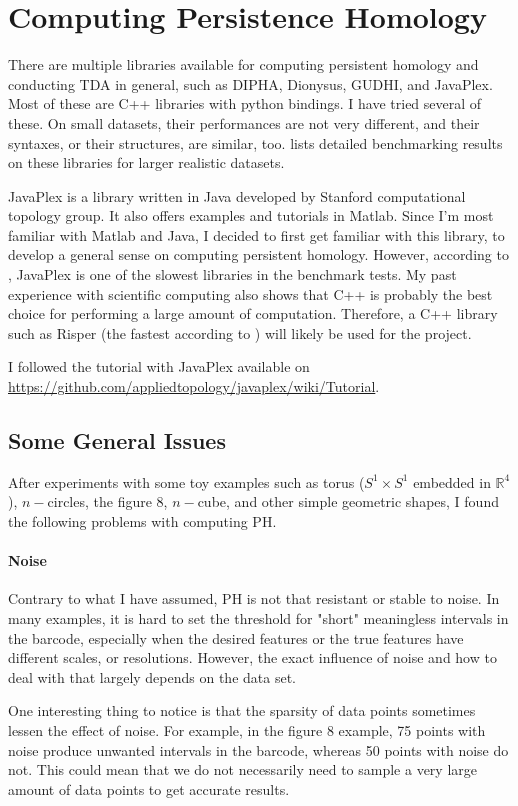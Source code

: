\documentclass[10pt,a4paper]{article}
\begin{document}
\section{Computing Persistence Homology}
There are multiple libraries available for computing persistent homology and conducting TDA in general, such as DIPHA, Dionysus, GUDHI, and JavaPlex. Most of these are C++ libraries with python bindings. I have tried several of these. On small datasets, their performances are not very different, and their syntaxes, or their structures, are similar, too. \cite{Otter2017} lists detailed benchmarking results on these libraries for larger realistic datasets.\par
JavaPlex\cite{Javaplex} is a library written in Java developed by Stanford computational topology group. It also offers examples and tutorials in Matlab. Since I'm most familiar with Matlab and Java, I decided to first get familiar with this library, to develop a general sense on computing persistent homology. However, according to \cite{Otter2017}, JavaPlex is one of the slowest libraries in the benchmark tests. My past experience with scientific computing also shows that C++ is probably the best choice for performing a large amount of computation. Therefore, a C++ library such as Risper (the fastest according to \cite{Otter2017}) will likely be used for the project.\par
I followed the tutorial with JavaPlex available on \url{https://github.com/appliedtopology/javaplex/wiki/Tutorial}.
\subsection{Some General Issues}
After experiments with some toy examples such as torus ($S^1\times S^1$ embedded in $\mathbb{R}^4$), $n-$circles, the figure 8, $n-$cube, and other simple geometric shapes, I found the following problems with computing PH.
\paragraph{Noise}
Contrary to what I have assumed, PH is not that resistant or stable to noise. In many examples, it is hard to set the threshold for "short" meaningless intervals in the barcode, especially when the desired features or the true features have different scales, or resolutions. However, the exact influence of noise and how to deal with that largely depends on the data set. \par
One interesting thing to notice is that the sparsity of data points sometimes lessen the effect of noise. For example, in the figure 8 example, 75 points with noise produce unwanted intervals in the barcode, whereas 50 points with noise do not. This could mean that we do not necessarily need to sample a very large amount of data points to get accurate results.
\end{document}
